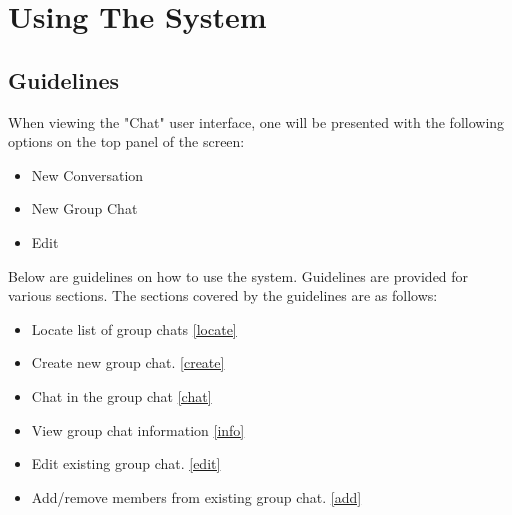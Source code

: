 \documentclass[11pt]{article}
\begin{document}
\section{Using The System}
\subsection{Guidelines}
When viewing the "Chat" user interface, one will be presented with the following options on the top panel of the screen:
\begin{itemize}
\item New Conversation
\item New Group Chat
\item Edit
\end{itemize}
Below are guidelines on how to use the system. Guidelines are provided for various sections. The sections covered by the guidelines are as follows:

\begin{itemize}
\item Locate list of group chats \ref{locate}
\item Create new group chat. \ref{create}
\item Chat in the group chat \ref{chat}
\item View group chat information \ref{info}
\item Edit existing group chat. \ref{edit}
\item Add/remove members from existing group chat. \ref{add}
\end{itemize}
\end{document}
